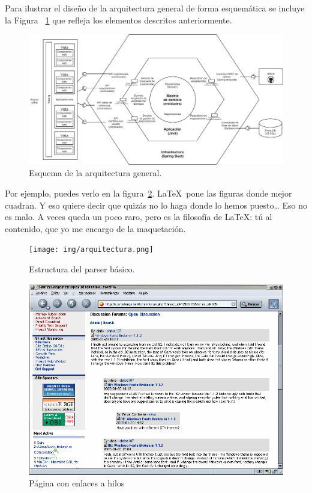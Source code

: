 \documentclass[a4paper, 12pt]{book}
\begin{document}
Para ilustrar el diseño de la arquitectura general de forma esquemática se incluye la Figura ~\ref{fig:general_architecture} que refleja los elementos descritos anteriormente.

\begin{figure}
  \centering
  \includegraphics[width=15cm, keepaspectratio]{img/Arquitectura_hexagonal.png}
  \caption{Esquema de la arquitectura general.}\label{fig:general_architecture}
\end{figure}


Por ejemplo, puedes verlo en la figura~\ref{fig:arquitectura}.
\LaTeX \ pone las figuras donde mejor cuadran. 
Y eso quiere decir que quizás no lo haga donde lo hemos puesto\ldots
Eso no es malo.
A veces queda un poco raro, pero es la filosofía de \LaTeX: tú al contenido, que yo me encargo de la maquetación.

\begin{figure}
  \centering
  \texttt{[image: img/arquitectura.png]}
  \caption{Estructura del parser básico.}\label{fig:arquitectura}
\end{figure}

\begin{figure}
    \centering
    \includegraphics[bb=0 0 800 600, width=12cm, keepaspectratio]{img/foro1}
    \caption{Página con enlaces a hilos}\label{fig:_arquitectura}
\end{figure}
\end{document}
